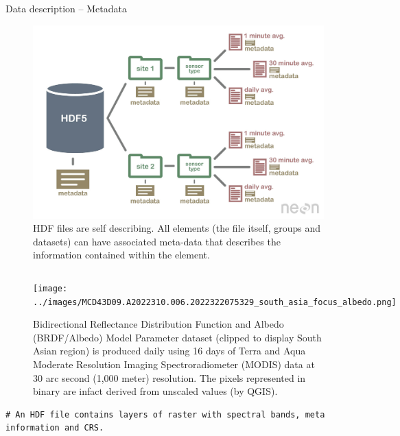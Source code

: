 \documentclass[10pt,dvipsnames,ignorenonframetext,aspectratio=169]{beamer}
\begin{document}
\begin{frame}[fragile]{Data description -- Metadata}
\protect\hypertarget{data-description-metadata}{}
\begin{figure}
\begin{columns}[T,onlytextwidth]

  \begin{center}
  \includegraphics[width=0.30\linewidth]{../images/2020-09-01-MODIS-hdf-file-info.jpg}
  \end{center}
  
  \caption{\newline HDF files are self describing. All elements (the file itself, groups and datasets) can have associated meta-data that describes the information contained within the element.}
  \label{fig:metadata-modis}
  
  \end{columns}
\end{figure}

\begin{figure}
\begin{columns}[T,onlytextwidth]

  \begin{center}
  \texttt{[image: ../images/MCD43D09.A2022310.006.2022322075329\_south\_asia\_focus\_albedo.png]}
  \end{center}
  
  \caption{\newline Bidirectional Reflectance Distribution Function and Albedo (BRDF/Albedo) Model Parameter dataset (clipped to display South Asian region) is produced daily using 16 days of Terra and Aqua Moderate Resolution Imaging Spectroradiometer (MODIS) data at 30 arc second (1,000 meter) resolution. The pixels represented in binary are infact derived from unscaled values (by QGIS).}
  \label{fig:modis-albedo-layer}
  
  \end{columns}
\end{figure}

\begin{verbatim}
# An HDF file contains layers of raster with spectral bands, meta information and CRS.


\end{verbatim}
\end{frame}
\end{document}
